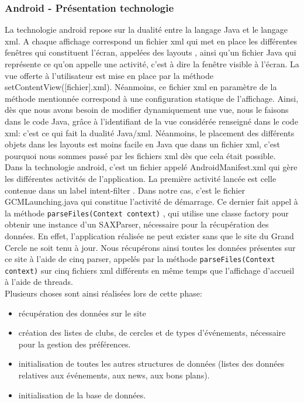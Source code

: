 \documentclass[a4paper, 11px]{article}
\begin{document}
\subsubsection{Android - Présentation technologie}
La technologie android repose sur la dualité entre la langage Java et le langage xml. A chaque affichage correspond un fichier xml qui met en place les différentes fenêtres qui constituent l'écran, appelées des \og layouts \fg, ainsi qu'un fichier Java qui représente ce qu'on appelle une activité, c'est à dire la fenêtre visible à l'écran. La vue offerte à l'utilisateur est mise en place par la méthode setContentView([fichier].xml). Néanmoins, ce fichier xml en paramètre de la méthode mentionnée correspond à une configuration statique de l'affichage. Ainsi, dès que nous avons besoin de modifier dynamiquement une vue, nous le faisons dans le code Java, grâce à l'identifiant de la vue considérée renseigné dans le code xml: c'est ce qui fait la dualité Java/xml. Néanmoins, le placement des différents objets dans les layouts est moins facile en Java que dans un fichier xml, c'est pourquoi nous sommes passé par les fichiers xml dès que cela était possible.\\

Dans la technologie android, c'est un fichier appelé AndroidManifest.xml qui gère les différentes activités de l'application. La première activité lancée est celle contenue dans un label \og intent-filter \fg. Dans notre cas, c'est le fichier GCMLaunching.java qui constitue l'activité de démarrage. Ce dernier fait appel à la méthode \texttt{parseFiles(Context context)} , qui utilise une classe factory pour obtenir une instance d'un SAXParser, nécessaire pour la récupération des données. En effet, l'application réalisée ne peut exister sans que le site du Grand Cercle ne soit tenu à jour. Nous récupérons ainsi toutes les données présentes sur ce site à l'aide de cinq parser, appelés par la méthode \texttt{parseFiles(Context context)}
 sur cinq fichiers xml différents en même temps que l'affichage d'accueil à l'aide de threads.\\

\noindent Plusieurs choses sont ainsi réalisées lors de cette phase:
\begin{itemize}
\item récupération des données sur le site
\item création des listes de clubs, de cercles et de types d'événements, nécessaire pour la gestion des préférences.
\item initialisation de toutes les autres structures de données (listes des données relatives aux événements, aux news, aux bons plans).
\item initialisation de la base de données.
\end{itemize}
\end{document}
